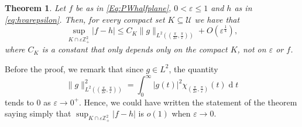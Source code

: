 \documentclass[12pt,a4paper,reqno]{amsart}
\newtheorem{thm}{Theorem}[section]
\theoremstyle{definition}
\theoremstyle{definition}\newtheorem{defn}[thm]{Definition}
\begin{document}
    
    \begin{thm}\label{T:approximationdiscrete}
    Let $f$ be as in \eqref{Eq:PWhalfplane}, $0<\varepsilon\leqslant1$ and $h$ as in \eqref{eq:hvarepsilon}. Then, for every compact set $K\subseteq \mathcal U$ we have that
    \[
    \sup_{K\cap\varepsilon\mathbb{Z}^2_+}|f-h|
    \leqslant C_K \|g\|_{L^2((\frac{\pi}{2\varepsilon},\frac{\pi}{\varepsilon}))}+O(\varepsilon^{\frac{1}{4}}),
    \]
    where $C_K$ is a constant that only depends only on the compact $K$, not on $\varepsilon$ or $f$.
    \end{thm}
    Before the proof, we remark that since $g\in L^2$, the quantity
    \[
    \|g\|_{L^2((\frac{\pi}{2\varepsilon},\frac{\pi}{\varepsilon}))}^2=\int_0^\infty |g(t)|^2 \chi_{(\frac{\pi}{2\varepsilon},\frac{\pi}{\varepsilon})}(t)\operatorname{d}\!t
    \]
    tends to $0$ as $\varepsilon\to 0^+$. Hence, we could have written the statement of the theorem saying simply that $\sup_{K\cap\varepsilon\mathbb{Z}^2_+}|f-h|$ is $o(1)$ when $\varepsilon\to 0$. 
\end{document}
